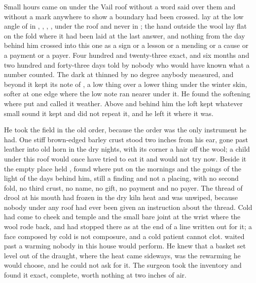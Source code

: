 
Small hours came on under the Vail roof without a word said over them and without a mark anywhere to show a boundary had been crossed.  lay at the low angle of  in , , , , under the roof and never in ; the hand outside the wool lay flat on the fold where it had been laid at the last answer, and nothing from the day behind him crossed into this one as a sign or a lesson or a mending or a cause or a payment or a payer. Four hundred and twenty-three exact, and six months and two hundred and forty-three days told by nobody who would have known what a number counted. The dark at  thinned by no degree anybody measured, and  beyond it kept its note of , a low thing over a lower thing under the winter skin, softer at one edge where the low note ran nearer under it. He found the softening where put and called it weather. Above and behind him the loft kept whatever small sound it kept and did not repeat it, and he left it where it was.

He took the field in the old order, because the order was the only instrument he had. One stiff brown-edged barley crust stood two inches from his ear, gone past leather into old horn in the dry nights, with its corner a hair off the wool; a child under this roof would once have tried to eat it and would not try now. Beside it the empty place held , found where put on the mornings and the goings of the light of the days behind him, still a finding and not a placing, with no second fold, no third crust, no name, no gift, no payment and no payer. The thread of drool at his mouth had frozen in the dry kiln heat and was unwiped, because nobody under any roof had ever been given an instruction about the thread. Cold had come to cheek and temple and the small bare joint at the wrist where the wool rode back, and had stopped there as at the end of a line written out for it; a face composed by cold is not composure, and a cold patient cannot clot.  waited past a warming nobody in this house would perform. He knew that a basket set level out of the draught, where the heat came sideways, was the rewarming he would choose, and he could not ask for it. The surgeon took the inventory and found it exact, complete, worth nothing at two inches of air.


